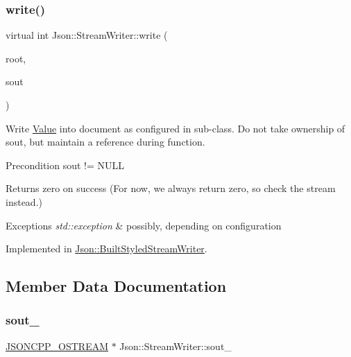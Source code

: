 \subsubsection{\texorpdfstring{write()}{write()}\hspace{0.1cm}{\footnotesize\ttfamily [2/2]}}
{\footnotesize\ttfamily virtual int Json\+::\+Stream\+Writer\+::write (\begin{DoxyParamCaption}\item[{\hyperlink{class_json_1_1_value}{Value} const \&}]{root,  }\item[{\hyperlink{config_8h_a37a25be5fca174927780caeb280094ce}{J\+S\+O\+N\+C\+P\+P\+\_\+\+O\+S\+T\+R\+E\+AM} $\ast$}]{sout }\end{DoxyParamCaption})\hspace{0.3cm}{\ttfamily [pure virtual]}}

Write \hyperlink{class_json_1_1_value}{Value} into document as configured in sub-\/class. Do not take ownership of sout, but maintain a reference during function. \begin{DoxyPrecond}{Precondition}
sout != N\+U\+LL 
\end{DoxyPrecond}
\begin{DoxyReturn}{Returns}
zero on success (For now, we always return zero, so check the stream instead.) 
\end{DoxyReturn}

\begin{DoxyExceptions}{Exceptions}
{\em std\+::exception} & possibly, depending on configuration \\
\hline
\end{DoxyExceptions}


Implemented in \hyperlink{struct_json_1_1_built_styled_stream_writer_a823cdb1afabb6b0d5f39bcd5a6a6f747}{Json\+::\+Built\+Styled\+Stream\+Writer}.



\subsection{Member Data Documentation}
\hypertarget{class_json_1_1_stream_writer_a479189c5615f3cf1b34cd2b716eea88d}{}\label{class_json_1_1_stream_writer_a479189c5615f3cf1b34cd2b716eea88d} 
\subsubsection{\texorpdfstring{sout\+\_\+}{sout\_}}
{\footnotesize\ttfamily \hyperlink{config_8h_a37a25be5fca174927780caeb280094ce}{J\+S\+O\+N\+C\+P\+P\+\_\+\+O\+S\+T\+R\+E\+AM} $\ast$ Json\+::\+Stream\+Writer\+::sout\+\_\+\hspace{0.3cm}{\ttfamily [protected]}}



